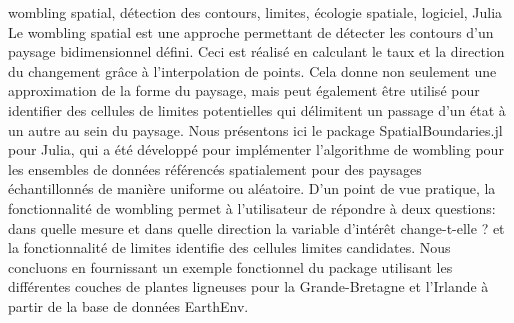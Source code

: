 \maketitle
\begin{refsection}

\begin{resume}{wombling spatial, détection des contours, limites, écologie spatiale, logiciel, Julia} Le wombling spatial est une approche permettant de détecter les contours d’un paysage bidimensionnel défini. Ceci est réalisé en calculant le taux et la direction du changement grâce à l’interpolation de points. Cela donne non seulement une approximation de la forme du paysage, mais peut également être utilisé pour identifier des cellules de limites potentielles qui délimitent un passage d'un état à un autre au sein du paysage. Nous présentons ici le package SpatialBoundaries.jl pour Julia, qui a été développé pour implémenter l'algorithme de wombling pour les ensembles de données référencés spatialement pour des paysages échantillonnés de manière uniforme ou aléatoire. D'un point de vue pratique, la fonctionnalité de wombling permet à l'utilisateur de répondre à deux questions: dans quelle mesure et dans quelle direction la variable d’intérêt change-t-elle ? et la fonctionnalité de limites identifie des cellules limites candidates. Nous concluons en fournissant un exemple fonctionnel du package utilisant les différentes couches de plantes ligneuses pour la Grande-Bretagne et l'Irlande à partir de la base de données EarthEnv.
\end{resume}

\begin{abstract}{spatial wombling, edge detection, boundaries, spatial ecology, software, Julia} Spatial wombling is an approach for detecting edges within a defined two-dimensional landscape. This is achieved by calculating the rate and direction of change through the interpolation of points. This not only gives an approximation as to the shape of the landscape but can also be used to identify candidate boundaries cells that delimit a shift from one state to another within the landscape. Here we introduce the SpatialBoundaries.jl package for Julia, which has been developed to implement the wombling algorithm for datasets that are spatially referenced for both uniformly or randomly sampled landscapes.From a practical perspective, the wombling functionality allow the user to answer two questions: how much and in which direction does the variable of interest change? and the boundaries functionality identifies candidate boundary cells. We conclude by providing a working example of the package using the various woody plant layers for Britain and Ireland from the EarthEnv database.
\end{abstract}


\end{refsection}
